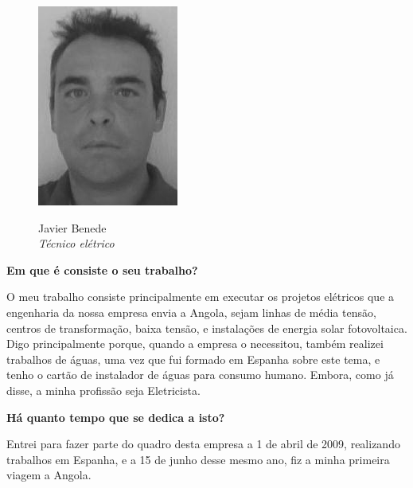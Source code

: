 \begin{figure} 
  \vspace{50pt}
  \begin{figurebox}
    \vspace{20pt}
    \centering
    \includegraphics[height=0.3\textheight]{JavierBenede-bn.png}

    Javier Benede\\
    {\sl Técnico elétrico}
    \vspace{20pt}
  \end{figurebox}
  \vspace{100pt}
\end{figure}


{\bf Em que é consiste o seu trabalho?}

\vspace{10pt}

O meu trabalho consiste principalmente em executar os projetos
elétricos que a engenharia da nossa empresa envia a Angola, sejam
linhas de média tensão, centros de transformação, baixa tensão, e
instalações de energia solar fotovoltaica. Digo principalmente porque,
quando a empresa o necessitou, também realizei trabalhos de águas, uma
vez que fui formado em Espanha sobre este tema, e tenho o cartão de
instalador de águas para consumo humano. Embora, como já disse, a
minha profissão seja Eletricista.

\vspace{20pt}

{\bf Há quanto tempo que se dedica a isto?}

\vspace{10pt}

Entrei para fazer parte do quadro desta empresa a 1 de abril de 2009,
realizando trabalhos em Espanha, e a 15 de junho desse mesmo ano, fiz
a minha primeira viagem a Angola.

\vspace{20pt}

